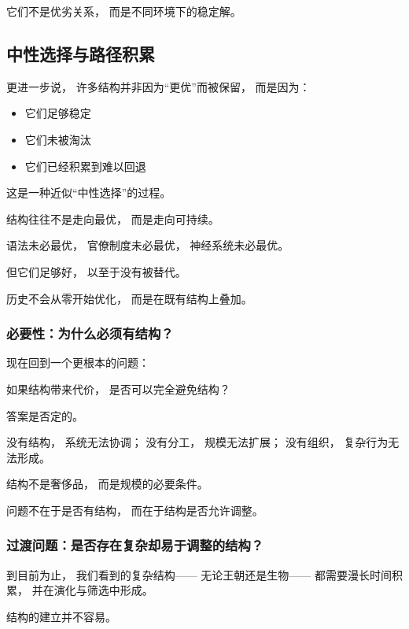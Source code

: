 \documentclass[openany, a4paper, 12pt]{book}
\begin{document}
它们不是优劣关系，
而是不同环境下的稳定解。

\subsection*{中性选择与路径积累}

更进一步说，
许多结构并非因为“更优”而被保留，
而是因为：

\begin{itemize}
	\item 它们足够稳定
	\item 它们未被淘汰
	\item 它们已经积累到难以回退
\end{itemize}

这是一种近似“中性选择”的过程。

\begin{readingnote}
	结构往往不是走向最优，
	而是走向可持续。
\end{readingnote}

语法未必最优，
官僚制度未必最优，
神经系统未必最优。

但它们足够好，
以至于没有被替代。

历史不会从零开始优化，
而是在既有结构上叠加。

\subsubsection*{必要性：为什么必须有结构？}

现在回到一个更根本的问题：

\begin{questionbox}
	如果结构带来代价，
	是否可以完全避免结构？
\end{questionbox}

答案是否定的。

没有结构，
系统无法协调；
没有分工，
规模无法扩展；
没有组织，
复杂行为无法形成。

结构不是奢侈品，
而是规模的必要条件。

问题不在于是否有结构，
而在于结构是否允许调整。

\subsubsection*{过渡问题：是否存在复杂却易于调整的结构？}

到目前为止，
我们看到的复杂结构——
无论王朝还是生物——
都需要漫长时间积累，
并在演化与筛选中形成。

结构的建立并不容易。
\end{document}
